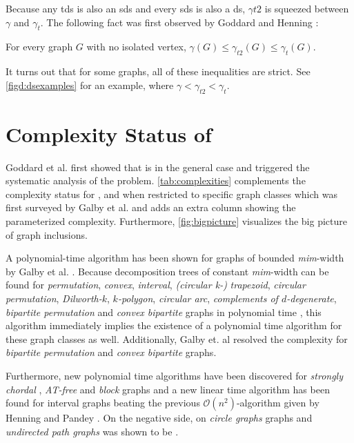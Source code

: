 Because any tds is also an sds and every sds is also a ds, $\gamma{t2}$ is squeezed between $\gamma$ and $\gamma_t$.
The  following fact was first observed by Goddard and Henning \cite{Goddard2014}:

\begin{fact}
For every graph $G$ with no isolated vertex, $\gamma(G) \leq \gamma_{t2}(G) \leq \gamma_t(G)$.
\end{fact}
It turns out that for some graphs, all of these inequalities are strict. See \cref{figd:dsexamples} for an example, where $\gamma < \gamma_{t2} < \gamma_t$.

\section{Complexity Status of \sdom}\label{ch:complexity-status}

Goddard et al. \cite{Goddard2014} first showed that \sdoms is \NPc in the general case and triggered the systematic analysis of the problem.  
\cref{tab:complexities} complements the complexity status for \DOM, \SDOM and \TDOM when restricted to specific graph classes which was first surveyed by Galby et al. \cite{Galby2020} and adds an extra column showing the parameterized complexity. 
Furthermore, \cref{fig:bigpicture} visualizes the big picture of graph inclusions.

A polynomial-time algorithm has been shown for graphs of bounded \textit{mim}-width by Galby et al. \cite{Galby2020}.
Because decomposition trees of constant \textit{mim}-width can be found for \textit{permutation}, \textit{convex}, \textit{interval}, \textit{(circular k-)} \textit{trapezoid}, \textit{circular permutation}, \textit{Dilworth-$k$}, \textit{$k$-polygon}, \textit{circular arc}, \textit{complements of $d$-degenerate}, \textit{bipartite permutation} and \textit{convex bipartite} graphs in polynomial time \cite{Belmonte2011}, this algorithm immediately implies the existence of a polynomial time algorithm for these graph classes as well. 
Additionally, Galby et. al resolved the complexity for \textit{bipartite permutation} and \textit{convex bipartite} graphs.

Furthermore, new polynomial time algorithms have been discovered for \textit{strongly chordal} \cite{Tripathi2021}, \textit{AT-free} \cite{Kloks2021} and \textit{block} \cite{Henning2022} graphs and a new linear time algorithm has been found for interval graphs \cite{Pradhan2021} beating the previous $\mathcal{O}(n^2)$-algorithm given by Henning and Pandey \cite{Henning2019}.
On the negative side, \sdom on \textit{circle graphs} \cite{Kloks2021} graphs and \textit{undirected path graphs} \cite{Henning2019} was shown to be \NPc.

